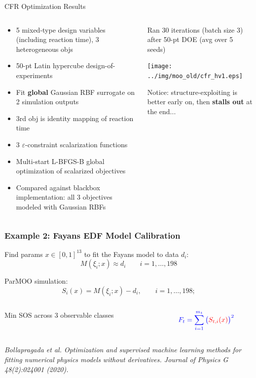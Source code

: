 \documentclass[aspectratio=169]{beamer}
\begin{document}
\begin{frame}{CFR Optimization Results}

\begin{columns}
\begin{column}{0.55\textwidth}
\begin{itemize}
\item 5 mixed-type design variables (including reaction time), 3 heterogeneous objs
\item 50-pt Latin hypercube design-of-experiments
\item Fit {\bf global} Gaussian RBF surrogate on 2 simulation outputs
\item {\color{blue}3rd obj is identity mapping of reaction time}
\item 3 $\varepsilon$-constraint scalarization functions
\item Multi-start L-BFGS-B global optimization of scalarized objectives
\item {\color{red}Compared against blackbox implementation: all 3 objectives
modeled with Gaussian RBFs}
\end{itemize}
\end{column}
\begin{column}{0.45\textwidth}
Ran 30 iterations (batch size 3) after 50-pt DOE (avg over 5 seeds)\\

\bigskip

\texttt{[image: ../img/moo\_old/cfr\_hv1.eps]}\\

\bigskip

Notice: structure-exploiting is better early on, then
{\bf stalls out} at the end...

\end{column}
\end{columns}
\end{frame}

\begin{frame}\frametitle{Example 2: Fayans EDF Model Calibration}
Find params $x \in [0, 1]^{13}$ to fit the Fayans model to data $d_i$:
$$
M\left(\xi_{i};x\right) \approx d_{i} \qquad i=1,\ldots, 198
$$

\medskip

ParMOO simulation:
$$
S_{i}(x) = M\left(\xi_{i};x\right) - d_{i},
\qquad i=1,\ldots, 198;
$$

\medskip

\begin{columns}
\begin{column}{0.65\textwidth}
Min SOS across 3 observable classes
\end{column}
\begin{column}{0.35\textwidth}
$$
{\color{blue}F_t = \sum_{i=1}^{m_t}\big({\color{red}S_{t,i}(x)}\big)^2}
$$
\end{column}
\end{columns}

\vfill

{\tiny\it
Bollapragada et al.
Optimization and supervised machine learning methods for fitting numerical physics models without derivatives.
Journal of Physics G 48(2):024001 (2020).\\}
\end{frame}
\end{document}
